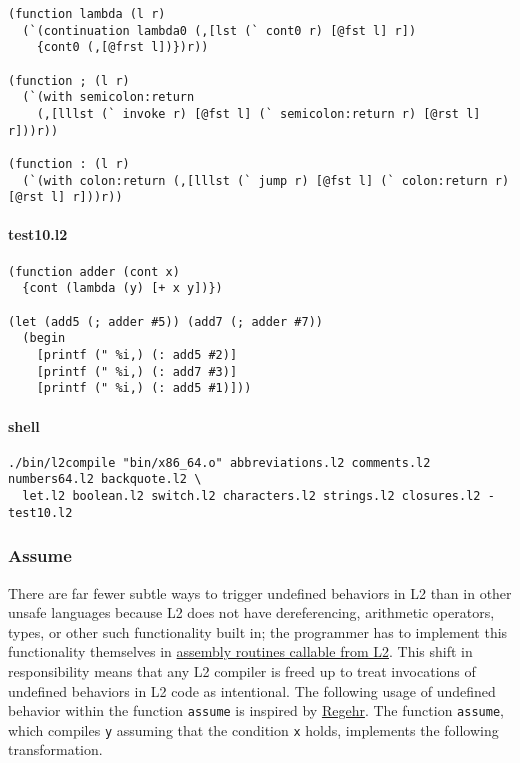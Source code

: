 \documentclass[]{article}
\let\oldparagraph\paragraph
\renewcommand{\paragraph}[1]{\oldparagraph{#1}\mbox{}}
\begin{document}
\begin{verbatim}
(function lambda (l r)
  (`(continuation lambda0 (,[lst (` cont0 r) [@fst l] r])
    {cont0 (,[@frst l])})r))

(function ; (l r)
  (`(with semicolon:return
    (,[lllst (` invoke r) [@fst l] (` semicolon:return r) [@rst l] r]))r))

(function : (l r)
  (`(with colon:return (,[lllst (` jump r) [@fst l] (` colon:return r) [@rst l] r]))r))
\end{verbatim}

\paragraph{test10.l2}\label{test10.l2}

\begin{verbatim}
(function adder (cont x)
  {cont (lambda (y) [+ x y])})

(let (add5 (; adder #5)) (add7 (; adder #7))
  (begin
    [printf (" %i,) (: add5 #2)]
    [printf (" %i,) (: add7 #3)]
    [printf (" %i,) (: add5 #1)]))
\end{verbatim}

\paragraph{shell}\label{shell-9}

\begin{verbatim}
./bin/l2compile "bin/x86_64.o" abbreviations.l2 comments.l2 numbers64.l2 backquote.l2 \
  let.l2 boolean.l2 switch.l2 characters.l2 strings.l2 closures.l2 - test10.l2
\end{verbatim}

\hypertarget{assume}{\subsubsection{Assume}\label{assume}}

There are far fewer subtle ways to trigger undefined behaviors in L2
than in other unsafe languages because L2 does not have dereferencing,
arithmetic operators, types, or other such functionality built in; the
programmer has to implement this functionality themselves in
\href{assets/x86_64.s}{assembly routines callable from L2}. This shift
in responsibility means that any L2 compiler is freed up to treat
invocations of undefined behaviors in L2 code as intentional. The
following usage of undefined behavior within the function
\texttt{assume} is inspired by
\href{https://blog.regehr.org/archives/1096}{Regehr}. The function
\texttt{assume}, which compiles \texttt{y} assuming that the condition
\texttt{x} holds, implements the following transformation.
\end{document}

